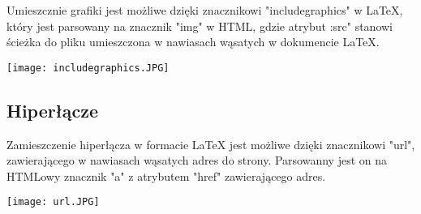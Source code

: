 Umieszcznie grafiki jest możliwe dzięki znacznikowi "includegraphics" w LaTeX, który jest parsowany na znacznik "img" w HTML, gdzie 
atrybut :src" stanowi ścieżka do pliku umieszczona w nawiasach wąsatych w dokumencie LaTeX.

\texttt{[image: includegraphics.JPG]}

\subsection{Hiperłącze}

Zamieszczenie hiperłącza w formacie LaTeX jest możliwe dzięki znacznikowi "url", zawierającego w nawiasach wąsatych adres do strony.
Parsowanny jest on na HTMLowy znacznik "a" z atrybutem "href" zawierającego adres.

\texttt{[image: url.JPG]}